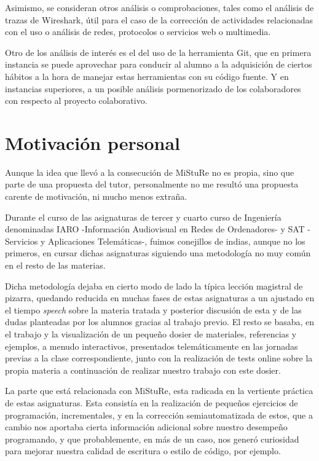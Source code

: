 Asimismo,  se consideran otros análisis o comprobaciones, tales como el análisis de trazas de Wireshark, útil para el caso de la corrección de actividades relacionadas con el uso o análisis de redes, protocolos o servicios web o multimedia.


Otro de los análisis de interés es el del uso de la herramienta Git, que en primera instancia se puede aprovechar para conducir al alumno a la adquisición de ciertos hábitos a la hora de manejar estas herramientas con su código fuente. Y en instancias superiores, a un posible análisis pormenorizado de los colaboradores con respecto al proyecto colaborativo.


\section{Motivación personal}

Aunque la idea que llevó a la consecución de MiStuRe no es propia, sino que parte de una propuesta del tutor, personalmente no me resultó una propuesta carente de motivación, ni mucho menos extraña.


Durante el curso de las asignaturas de tercer y cuarto curso de Ingeniería denominadas IARO -Información Audiovisual en Redes de Ordenadores- y SAT -Servicios y Aplicaciones Telemáticas-, fuimos conejillos de indias, aunque no los primeros, en cursar dichas asignaturas siguiendo una metodología no muy común en el resto de las materias.


Dicha metodología dejaba en cierto modo de lado la típica lección magistral de pizarra, quedando reducida en muchas fases de estas asignaturas a un ajustado en el tiempo \textit{speech} sobre la materia tratada y posterior discusión de esta y de las dudas planteadas por los alumnos gracias al trabajo previo. El resto se basaba, en el trabajo y la visualización de un pequeño dosier de materiales, referencias y ejemplos, a menudo interactivos, presentados telemáticamente en las jornadas previas a la clase correspondiente, junto con la realización de tests online sobre la propia materia a continuación de realizar nuestro trabajo con este dosier.


La parte que está relacionada con MiStuRe, esta radicada en la vertiente práctica de estas asignaturas. Esta consistía en la realización de pequeños ejercicios de programación, incrementales, y en la corrección semiautomatizada de estos, que a cambio nos aportaba cierta información adicional sobre nuestro desempeño programando, y que probablemente, en más de un caso, nos generó curiosidad para mejorar nuestra calidad de escritura o estilo de código, por ejemplo.


